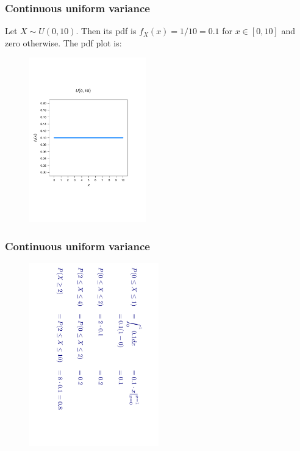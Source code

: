 \documentclass[notes=show,smaller,handout]{beamer}
\begin{document}
\begin{frame}%

\frametitle{Continuous uniform variance}

\begin{example} 
Let $X \sim U(0,10)$. Then its pdf is $f_X(x) = 1/10=0.1$ for $x\in[0,10]$ and zero otherwise. The pdf plot is:

\begin{figure}[ptb]\centering
\includegraphics[width=0.45\textwidth,height=0.65\textheight]{Unif_Diego.pdf}%
\end{figure}%

\end{example} 
\end{frame}%


\begin{frame}%

\frametitle{Continuous uniform variance}

\begin{example}[cont'd]
 

\begin{figure}[ptb]\centering
\includegraphics[width=0.5\textwidth,height=0.9\textheight, angle= 90]{Unif_Diego_Calc.pdf}%
\end{figure}%



\end{example} 
\end{frame}%
\end{document}
